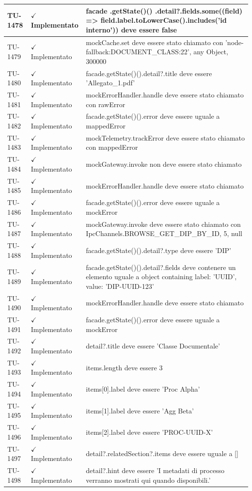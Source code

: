 ﻿\documentclass[a4paper,12pt]{article}
\newcommand{\ok}{\textcolor{green!60!black}{$\checkmark$ Implementato}}
\begin{document}
\begin{longtable}{|p{2cm}|p{3.5cm}|p{9.5cm}|}
\hline
TU-1478 & \ok & facade .getState()() .detail?.fields.some((field) => field.label.toLowerCase().includes('id interno')) deve essere false \\
\hline
TU-1479 & \ok & mockCache.set deve essere stato chiamato con 'node-fallback:DOCUMENT\_CLASS:22', any Object, 300000 \\
\hline
TU-1480 & \ok & facade.getState()().detail?.title deve essere 'Allegato\_1.pdf' \\
\hline
TU-1481 & \ok & mockErrorHandler.handle deve essere stato chiamato con rawError \\
\hline
TU-1482 & \ok & facade.getState()().error deve essere uguale a mappedError \\
\hline
TU-1483 & \ok & mockTelemetry.trackError deve essere stato chiamato con mappedError \\
\hline
TU-1484 & \ok & mockGateway.invoke non deve essere stato chiamato \\
\hline
TU-1485 & \ok & mockErrorHandler.handle deve essere stato chiamato \\
\hline
TU-1486 & \ok & facade.getState()().error deve essere uguale a mockError \\
\hline
TU-1487 & \ok & mockGateway.invoke deve essere stato chiamato con IpcChannels.BROWSE\_GET\_DIP\_BY\_ID, 5, null \\
\hline
TU-1488 & \ok & facade.getState()().detail?.type deve essere 'DIP' \\
\hline
TU-1489 & \ok & facade.getState()().detail?.fields deve contenere un elemento uguale a object containing { label: 'UUID', value: 'DIP-UUID-123' } \\
\hline
TU-1490 & \ok & mockErrorHandler.handle deve essere stato chiamato \\
\hline
TU-1491 & \ok & facade.getState()().error deve essere uguale a mockError \\
\hline
TU-1492 & \ok & detail?.title deve essere 'Classe Documentale' \\
\hline
TU-1493 & \ok & items.length deve essere 3 \\
\hline
TU-1494 & \ok & items[0].label deve essere 'Proc Alpha' \\
\hline
TU-1495 & \ok & items[1].label deve essere 'Agg Beta' \\
\hline
TU-1496 & \ok & items[2].label deve essere 'PROC-UUID-X' \\
\hline
TU-1497 & \ok & detail?.relatedSection?.items deve essere uguale a [] \\
\hline
TU-1498 & \ok & detail?.hint deve essere 'I metadati di processo verranno mostrati qui quando disponibili.' \\

\end{longtable}
\end{document}
